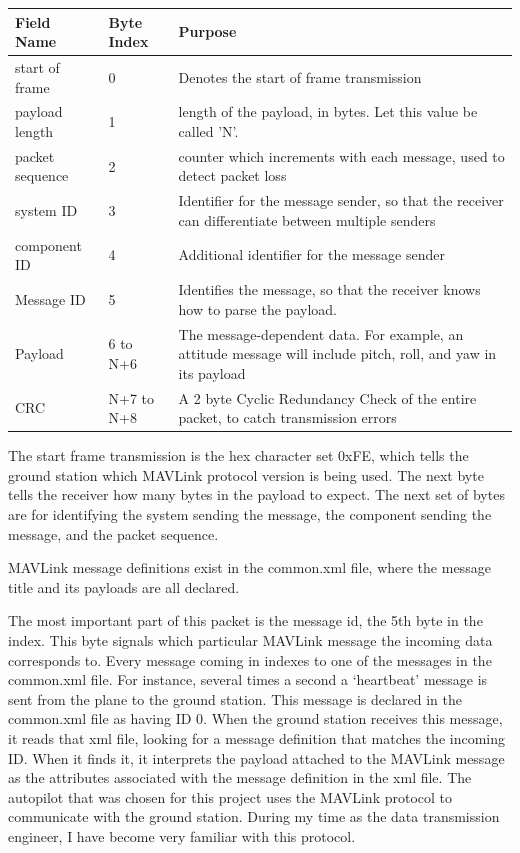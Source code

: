 \documentclass[12pt,journal,compsoc]{IEEEtran}
\begin{document}
\begin{table}[h!]
\centering

\begin{tabular}{|p{1.5cm}|p{0.9cm}|p{5cm}|}
\hline
Field Name & Byte Index & Purpose\\
\hline
start of frame & 0 & Denotes the start of frame transmission \\
\hline
payload length & 1 & length of the payload, in bytes. Let this value be called 'N'. \\
\hline
packet sequence & 2 & counter which increments with each message, used to detect packet loss \\
\hline
system ID & 3 & Identifier for the message sender, so that the receiver can differentiate between multiple senders\\
\hline
component ID & 4 & Additional identifier for the message sender\\
\hline
Message ID & 5 & Identifies the message, so that the receiver knows how to parse the payload.\\
\hline
Payload & 6 to N+6 & The message-dependent data. For example, an attitude message will include pitch, roll, and yaw in its payload\\
\hline
CRC & N+7 to N+8 & A 2 byte Cyclic Redundancy Check of the entire packet, to catch transmission errors\\
\hline
\end{tabular}
\label{x8rChannels}
\end{table}

The start frame transmission is the hex character set 0xFE, which tells the ground station which MAVLink protocol version is being used. The next byte tells the receiver how many bytes in the payload to expect. The next set of bytes are for identifying the system sending the message, the component sending the message, and the packet sequence.

MAVLink message definitions exist in the common.xml file, where the message title and its payloads are all declared.

The most important part of this packet is the message id, the 5th byte in the index. This byte signals which particular MAVLink message the incoming data corresponds to. Every message coming in indexes to one of the messages in the common.xml file. For instance, several times a second a `heartbeat' message is sent from the plane to the ground station. This message is declared in the common.xml file as having ID 0. When the ground station receives this message, it reads that xml file, looking for a message definition that matches the incoming ID. When it finds it, it interprets the payload attached to the MAVLink message as the attributes associated with the message definition in the xml file. 
The autopilot that was chosen for this project uses the MAVLink protocol to communicate with the ground station. During my time as the data transmission engineer, I have become very familiar with this protocol.
\end{document}
